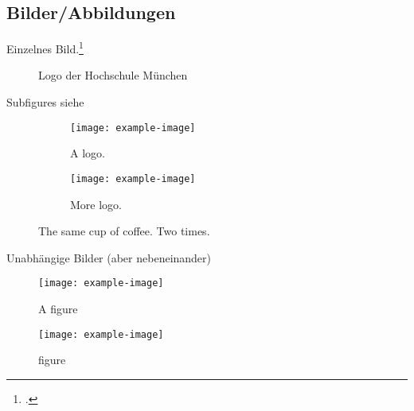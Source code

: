 \subsection{Bilder/Abbildungen}\label{subsec:abbildungen}
	
Einzelnes Bild.\footcite{higgins1996activation}
	
\begin{figure}[H]
	\centering
	\begin{minipage}{0.6\textwidth}
		\centering
	\end{minipage}
	\caption{Logo der Hochschule München}
  	\label{fig:logo}
\end{figure}
	
Subfigures siehe 
	
\begin{figure}[H]
  	\centering
  	\begin{subfigure}[b]{0.4\textwidth}
    	\texttt{[image: example-image]}
    	\caption{A logo.}
  	\end{subfigure}
  	\begin{subfigure}[b]{0.4\textwidth}
    	\texttt{[image: example-image]}
    	\caption{More logo.}
  	\end{subfigure}
  	\caption{The same cup of coffee. Two times.}
  	\label{fig:coffee}
\end{figure}
	
Unabhängige Bilder (aber nebeneinander)
	
\begin{figure}[H]
	\centering
	\begin{minipage}{.5\textwidth}
  		\centering
  		\texttt{[image: example-image]}
  		\caption{A figure}
  		\label{fig:test1}
	\end{minipage}%
	\begin{minipage}{.5\textwidth}
  		\centering
  		\texttt{[image: example-image]}
  		\caption{figure}
  		\label{fig:test2}
	\end{minipage}
\end{figure}